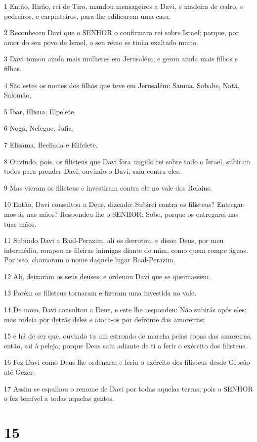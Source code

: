 \par 1 Então, Hirão, rei de Tiro, mandou mensageiros a Davi, e madeira de cedro, e pedreiros, e carpinteiros, para lhe edificarem uma casa.
\par 2 Reconheceu Davi que o SENHOR o confirmara rei sobre Israel; porque, por amor do seu povo de Israel, o seu reino se tinha exaltado muito.
\par 3 Davi tomou ainda mais mulheres em Jerusalém; e gerou ainda mais filhos e filhas.
\par 4 São estes os nomes dos filhos que teve em Jerusalém: Samua, Sobabe, Natã, Salomão,
\par 5 Ibar, Elisua, Elpelete,
\par 6 Nogá, Nefegue, Jafia,
\par 7 Elisama, Beeliada e Elifelete.
\par 8 Ouvindo, pois, os filisteus que Davi fora ungido rei sobre todo o Israel, subiram todos para prender Davi; ouvindo-o Davi, saiu contra eles.
\par 9 Mas vieram os filisteus e investiram contra ele no vale dos Refains.
\par 10 Então, Davi consultou a Deus, dizendo: Subirei contra os filisteus? Entregar-mos-ás nas mãos? Respondeu-lhe o SENHOR: Sobe, porque os entregarei nas tuas mãos.
\par 11 Subindo Davi a Baal-Perazim, ali os derrotou; e disse: Deus, por meu intermédio, rompeu as fileiras inimigas diante de mim, como quem rompe águas. Por isso, chamaram o nome daquele lugar Baal-Perazim.
\par 12 Ali, deixaram os seus deuses; e ordenou Davi que se queimassem.
\par 13 Porém os filisteus tornaram e fizeram uma investida no vale.
\par 14 De novo, Davi consultou a Deus, e este lhe respondeu: Não subirás após eles; mas rodeia por detrás deles e ataca-os por defronte das amoreiras;
\par 15 e há de ser que, ouvindo tu um estrondo de marcha pelas copas das amoreiras, então, sai à peleja; porque Deus saiu adiante de ti a ferir o exército dos filisteus.
\par 16 Fez Davi como Deus lhe ordenara; e feriu o exército dos filisteus desde Gibeão até Gezer.
\par 17 Assim se espalhou o renome de Davi por todas aquelas terras; pois o SENHOR o fez temível a todas aquelas gentes.

\chapter{15}

